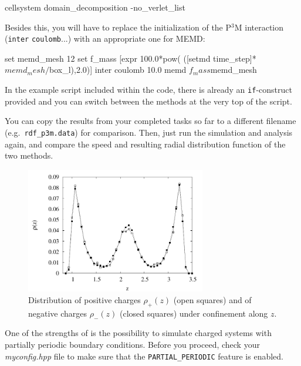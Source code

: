 \documentclass[
a4paper,                        %
11pt,                           %
twoside,                        %
footsepline,                    %
headsepline,                    %
headexclude,                    %
footexclude,                    %
pagesize,                       %
]{scrartcl}
\begin{document}
\begin{tclcode}
  cellsystem domain_decomposition -no_verlet_list
\end{tclcode}


Besides this, you will have to replace the initialization of the
P$^3$M interaction (\verb|inter| \verb|coulomb|...) with an
appropriate one for MEMD:

\begin{tclcode}
  set memd_mesh 12
  set f_mass [expr 100.0*pow( ([setmd time_step]*$memd_mesh/$box_l),2.0)]
  inter coulomb 10.0 memd $f_mass $memd_mesh
\end{tclcode}


In the example script included
within the \es{} code, there is already an \verb|if|-construct 
provided and you can switch between the methods at the very top
of the script.

You can copy the results from your completed tasks so far to a different
filename (e.g.~\verb|rdf_p3m.data|) for comparison. Then, just
run the simulation and analysis again, and compare the speed and 
resulting radial distribution function of the two methods.
\fi


\iffalse
\begin{figure}[h]
  \centering
  \includegraphics[width=0.7\textwidth]{figures/neutral-rho}
  \caption{Distribution of positive charges $\rho_+(z)$ (open squares)
    and of negative charges $\rho_-(z)$ (closed squares) under
    confinement along $z$.}
  \label{fig:neutralrho}
\end{figure}

One of the strengths of \es{} is the possibility to simulate charged
systems with partially periodic boundary conditions.
Before you proceed, check your \emph{myconfig.hpp} file to make
sure that the \verb|PARTIAL_PERIODIC| feature is enabled.
\end{document}
